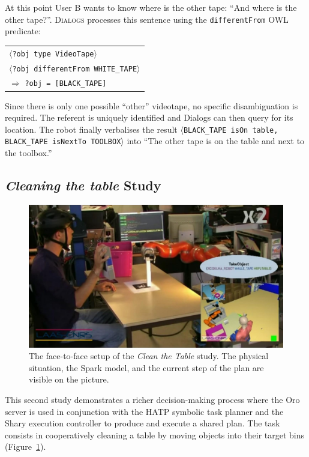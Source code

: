 \documentclass[preprint,3p,times]{elsarticle}
\newcommand{\concept}[1]{{\small \texttt{#1}}}
\newcommand{\stmt}[1]{{\footnotesize\tt$\langle$#1\relax$\rangle$}}
\begin{document}
At this point User B wants to know where is the other tape: ``And where is the
other tape?''. \textsc{Dialogs} processes this sentence using the
\concept{differentFrom} OWL predicate:

\begin{center}
\begin{tabular}{l}
\stmt{?obj type VideoTape}\\
\stmt{?obj differentFrom WHITE\_TAPE}\\
\hspace{0.7cm}$\Rightarrow$ \concept{?obj = [BLACK\_TAPE]}
\end{tabular}
\end{center}

Since there is only one possible ``other'' videotape, no specific
disambiguation is required. The referent is uniquely identified and {\sc
Dialogs} can then query for its location. The robot finally verbalises the
result \stmt{BLACK\_TAPE isOn table, BLACK\_TAPE isNextTo TOOLBOX} into ``The
other tape is on the table and next to the toolbox.''

\subsection{\emph{Cleaning the table} Study}
\label{sec:cleantable}

\begin{figure}[ht!]
    \centering
    \includegraphics[width=0.6\columnwidth]{cleantable.jpg}

    \caption{The face-to-face setup of the \emph{Clean the Table} study. The
    physical situation, the {\sc Spark} model, and the current step of the plan
    are visible on the picture.}

    \label{fig|cleantable-video}
\end{figure}

This second study demonstrates a richer decision-making process where the {\sc
Oro} server is used in conjunction with the HATP symbolic task planner and the
{\sc Shary} execution controller to produce and execute a shared plan. The task
consists in cooperatively cleaning a table by moving objects into their target
bins (Figure~\ref{fig|cleantable-video}).
\end{document}
